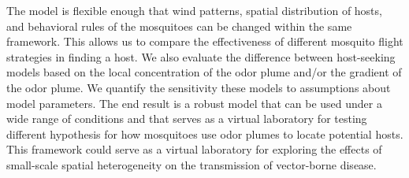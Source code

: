 \documentclass[12pt]{article}
\newif\ifcommentsw
\newcommand{\comment}[1]{\ifcommentsw  $\blacktriangleright$\ \textbf{#1}\ $\blacktriangleleft$ \fi}
\begin{document}
The model is flexible enough that wind patterns, spatial distribution of hosts, and behavioral rules of the mosquitoes can be changed within the same framework.  This allows us to compare the effectiveness of different mosquito flight strategies in finding a host.  We also evaluate the difference between host-seeking models based on the local concentration of the odor plume and/or the gradient of the odor plume. We
quantify the sensitivity these models to assumptions about model parameters.
The end result is a robust model that can be used under a wide range of conditions and that serves as a virtual laboratory for testing different hypothesis for how mosquitoes use odor plumes to locate potential hosts.
This framework could serve as a virtual laboratory for exploring the effects of small-scale spatial heterogeneity on the transmission of vector-borne disease.
\comment{What is the consensus on this last sentence? Is it a reasonable claim? BC  I like it. MH}







\end{document}
